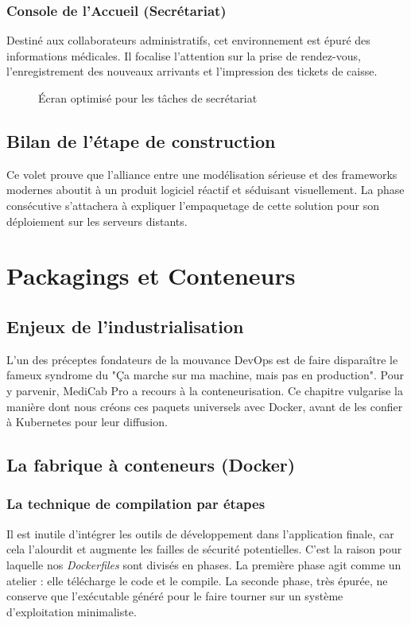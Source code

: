 \documentclass[final]{report}
\begin{document}
\subsection{Console de l'Accueil (Secrétariat)}
Destiné aux collaborateurs administratifs, cet environnement est épuré des informations médicales. Il focalise l'attention sur la prise de rendez-vous, l'enregistrement des nouveaux arrivants et l'impression des tickets de caisse.
\begin{figure}[H]
  \centering
  \caption{Écran optimisé pour les tâches de secrétariat}
\end{figure}
 
\section{Bilan de l'étape de construction}
Ce volet prouve que l'alliance entre une modélisation sérieuse et des frameworks modernes aboutit à un produit logiciel réactif et séduisant visuellement. La phase consécutive s'attachera à expliquer l'empaquetage de cette solution pour son déploiement sur les serveurs distants.
 

\chapter{Packagings et Conteneurs}
 
\section{Enjeux de l'industrialisation}
L'un des préceptes fondateurs de la mouvance DevOps est de faire disparaître le fameux syndrome du "Ça marche sur ma machine, mais pas en production". Pour y parvenir, MediCab Pro a recours à la conteneurisation. Ce chapitre vulgarise la manière dont nous créons ces paquets universels avec Docker, avant de les confier à Kubernetes pour leur diffusion.
 
\section{La fabrique à conteneurs (Docker)}
\subsection{La technique de compilation par étapes}
Il est inutile d'intégrer les outils de développement dans l'application finale, car cela l'alourdit et augmente les failles de sécurité potentielles. C'est la raison pour laquelle nos \textit{Dockerfiles} sont divisés en phases. La première phase agit comme un atelier : elle télécharge le code et le compile. La seconde phase, très épurée, ne conserve que l'exécutable généré pour le faire tourner sur un système d'exploitation minimaliste.
 
\end{document}

